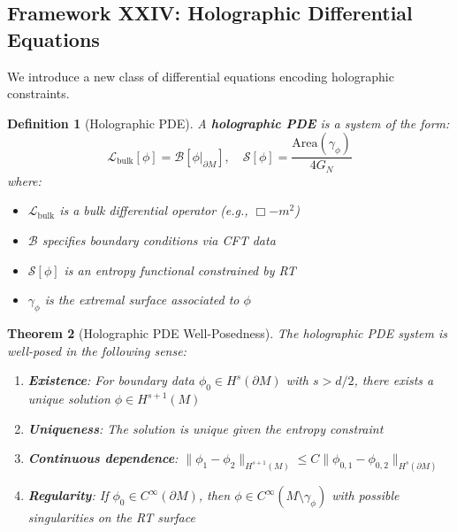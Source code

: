 \documentclass[12pt,a4paper]{article}
\newtheorem{theorem}{Theorem}[section]
\newtheorem{definition}[theorem]{Definition}
\begin{document}
\subsection{Framework XXIV: Holographic Differential Equations}

We introduce a new class of differential equations encoding holographic constraints.

\begin{definition}[Holographic PDE]\label{def:holo-pde}
A \textbf{holographic PDE} is a system of the form:
\begin{equation}
\mathcal{L}_{\text{bulk}}[\phi] = \mathcal{B}[\phi|_{\partial M}], \quad \mathcal{S}[\phi] = \frac{\text{Area}(\gamma_\phi)}{4G_N}
\end{equation}
where:
\begin{itemize}
    \item $\mathcal{L}_{\text{bulk}}$ is a bulk differential operator (e.g., $\Box - m^2$)
    \item $\mathcal{B}$ specifies boundary conditions via CFT data
    \item $\mathcal{S}[\phi]$ is an entropy functional constrained by RT
    \item $\gamma_\phi$ is the extremal surface associated to $\phi$
\end{itemize}
\end{definition}

\begin{theorem}[Holographic PDE Well-Posedness]\label{thm:holo-wellposed}
The holographic PDE system is well-posed in the following sense:
\begin{enumerate}
    \item \textbf{Existence}: For boundary data $\phi_0 \in H^s(\partial M)$ with $s > d/2$, there exists a unique solution $\phi \in H^{s+1}(M)$
    \item \textbf{Uniqueness}: The solution is unique given the entropy constraint
    \item \textbf{Continuous dependence}: $\|\phi_1 - \phi_2\|_{H^{s+1}(M)} \leq C \|\phi_{0,1} - \phi_{0,2}\|_{H^s(\partial M)}$
    \item \textbf{Regularity}: If $\phi_0 \in C^\infty(\partial M)$, then $\phi \in C^\infty(M \setminus \gamma_\phi)$ with possible singularities on the RT surface
\end{enumerate}
\end{theorem}
\end{document}
